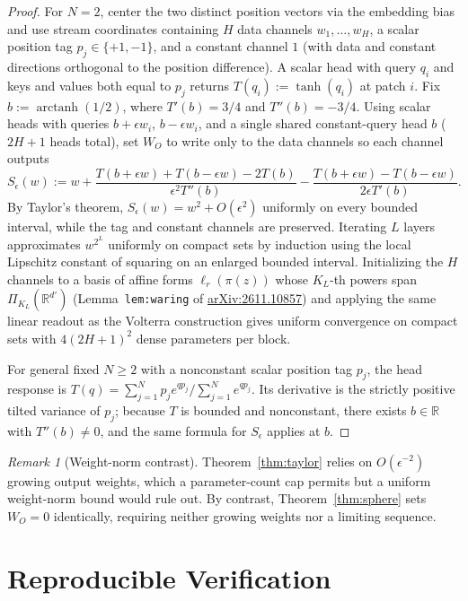 \documentclass[11pt]{article}
\theoremstyle{plain}
\theoremstyle{definition}
\theoremstyle{remark}
\newtheorem{remark}{Remark}
\DeclareMathOperator{\arctanh}{arctanh}
\begin{document}
\begin{proof}
For $N = 2$, center the two distinct position vectors via the embedding bias and use stream coordinates containing $H$ data channels $w_1, \dots, w_H$, a scalar position tag $p_j \in \{+1, -1\}$, and a constant channel $1$ (with data and constant directions orthogonal to the position difference). A scalar head with query $q_i$ and keys and values both equal to $p_j$ returns $T(q_i) := \tanh(q_i)$ at patch $i$. Fix $b := \arctanh(1/2)$, where $T'(b) = 3/4$ and $T''(b) = -3/4$. Using scalar heads with queries $b + \epsilon w_i$, $b - \epsilon w_i$, and a single shared constant-query head $b$ ($2H + 1$ heads total), set $W_O$ to write only to the data channels so each channel outputs
\[
S_\epsilon(w) := w
+ \frac{T(b + \epsilon w) + T(b - \epsilon w) - 2T(b)}{\epsilon^2 T''(b)}
- \frac{T(b + \epsilon w) - T(b - \epsilon w)}{2\epsilon T'(b)}.
\]
By Taylor's theorem, $S_\epsilon(w) = w^2 + O(\epsilon^2)$ uniformly on every bounded interval, while the tag and constant channels are preserved. Iterating $L$ layers approximates $w^{2^L}$ uniformly on compact sets by induction using the local Lipschitz constant of squaring on an enlarged bounded interval. Initializing the $H$ channels to a basis of affine forms $\ell_r(\pi(z))$ whose $K_L$-th powers span $\Pi_{K_L}(\mathbb{R}^{d'})$ (Lemma~\texttt{lem:waring} of \href{https://arxiv.org/abs/2611.10857}{arXiv:2611.10857}) and applying the same linear readout as the Volterra construction gives uniform convergence on compact sets with $4(2H + 1)^2$ dense parameters per block.

For general fixed $N \ge 2$ with a nonconstant scalar position tag $p_j$, the head response is $T(q) = \sum_{j=1}^N p_j e^{qp_j}/\sum_{j=1}^N e^{qp_j}$. Its derivative is the strictly positive tilted variance of $p_j$; because $T$ is bounded and nonconstant, there exists $b \in \mathbb{R}$ with $T''(b) \neq 0$, and the same formula for $S_\epsilon$ applies at $b$.
\end{proof}

\begin{remark}[Weight-norm contrast]
Theorem~\ref{thm:taylor} relies on $O(\epsilon^{-2})$ growing output weights, which a parameter-count cap permits but a uniform weight-norm bound would rule out. By contrast, Theorem~\ref{thm:sphere} sets $W_O = 0$ identically, requiring neither growing weights nor a limiting sequence.
\end{remark}

\section{Reproducible Verification}
\end{document}
